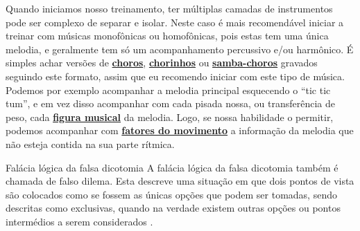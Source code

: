 \begin{example}
Quando iniciamos nosso treinamento, 
ter múltiplas camadas de instrumentos pode ser complexo de separar e isolar.
Neste caso é mais recomendável iniciar a treinar com músicas monofônicas ou  homofônicas,
pois estas tem uma única melodia, e geralmente tem só um acompanhamento percussivo e/ou harmônico.
É simples achar versões de \hyperref[subsec:musicchoro]{\textbf{choros}}, 
\hyperref[subsec:musicchoro]{\textbf{chorinhos}} ou 
\hyperref[subsec:musicsambachoro]{\textbf{samba-choros}} gravados seguindo este formato,
assim que eu recomendo iniciar com este tipo de música.
Podemos por exemplo acompanhar a melodia principal esquecendo o ``tic tic tum'',
e em vez disso acompanhar com cada pisada nossa, ou transferência de peso, 
cada \hyperref[sec:figurasmusicais]{\textbf{figura musical}} da melodia. Logo, 
se nossa habilidade o permitir, podemos acompanhar com \hyperref[subsec:fatordinamica]{\textbf{fatores do movimento}}
a informação da melodia que não esteja contida na sua parte rítmica.
\end{example}






\begin{elaboracion}{Falácia lógica da falsa dicotomia}
\label{ref:falsadilema}
A falácia lógica da falsa dicotomia também é chamada de falso dilema. 
Esta descreve uma situação em que dois pontos de vista são colocados 
como se fossem as únicas opções que podem ser tomadas, sendo descritas como exclusivas,
quando na verdade existem outras opções ou pontos intermédios a serem considerados
\cite[pp. 163]{rainbolt2012critical}.
\end{elaboracion}


